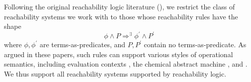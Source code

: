\begin{remark}\label{rem:shapeOfReachabilityRules}
  Following the original reachability logic literature (\cite{RosuS12oopsla,StefanescuCMMSR19}),
  we restrict the class of reachability systems we work with to those whose reachability rules
have the shape
\begin{equation*}
    \phi \land P \Rightarrow^\exists \phi^\prime \land P^\prime
\end{equation*}
where $\phi,\phi^\prime$ are terms-as-predicates, and $P,P^\prime$ contain no terms-as-predicate.
  As argued in these papers, such rules can support various styles of operational semantics,
  including evaluation contexts \cite{PLTRedex}, the chemical abstract machine \cite{CHAM}, and \K{} \cite{KVision}.
  We thus support all reachability systems supported by reachability logic.
\end{remark}

